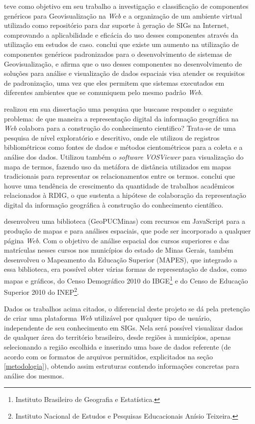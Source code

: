 \documentclass[12pt]{article}
\begin{document}
\citet{laudares} teve como objetivo em seu trabalho a investigação e classificação de componentes genéricos para Geovisualização na \emph{Web} e a organização de um ambiente virtual utilizado como repositório para dar suporte à geração de SIGs na Internet, comprovando a aplicabilidade e eficácia do uso desses componentes através da utilização em estudos de caso. \citeauthor{laudares} conclui que existe um aumento na utilização de componentes genéricos padronizados para o desenvolvimento de sistemas de Geovisualização, e afirma que o uso desses componentes no desenvolvimento de soluções para análise e visualização de dados espaciais visa atender os requisitos de padronização, uma vez que eles permitem que sistemas executados em diferentes ambientes que se comuniquem pelo mesmo padrão \emph{Web}.

\citet{santos} realizou em sua dissertação uma pesquisa que buscasse responder o seguinte problema: de que maneira a representação digital da informação geográfica na \emph{Web} colabora para a construção do conhecimento cientifico? Trata-se de uma pesquisa de nível exploratório e descritivo, onde ele utilizou de registros bibliométricos como fontes de dados e métodos cientométricos para a coleta e a análise dos dados. Utilizou também o \emph{software VOSViewer} para visualização do mapa de termos, fazendo uso da metáfora de distância utilizados em mapas tradicionais para representar os relacionamentos entre os termos. \citeauthor{santos} conclui que houve uma tendência de crescimento da quantidade de trabalhos acadêmicos relacionados à RDIG, o que sustenta a hipótese de colaboração da representação digital da informação geográfica à construção do conhecimento científico.

\citet{kutova} desenvolveu uma biblioteca (GeoPUCMinas) com recursos em JavaScript para a produção de mapas e para análises espaciais, que pode ser incorporado a qualquer página \emph{Web}. Com o objetivo de análise espacial dos cursos superiores e das matrículas nesses cursos nos municípios do estado de Minas Gerais, \citeauthor{kutova} também desenvolveu o Mapeamento da Educação Superior (MAPES), que integrado a essa biblioteca, era possível obter várias formas de representação de dados, como mapas e gráficos, do Censo Demográfico 2010 do IBGE\footnote{Instituto Brasileiro de Geografia e Estatística.} e do Censo de Educação Superior 2010 do INEP\footnote{Instituto Nacional de Estudos e Pesquisas Educacionais Anísio Teixeira.}.

Dados os trabalhos acima citados, o diferencial deste projeto se dá pela pretenção de criar uma plataforma \emph{Web} utilizável por qualquer tipo de usuário, independente de seu conhecimento em SIGs. Nela será possível visualizar dados de qualquer área do território brasileiro, desde regiões à municípios, apenas selecionando a região escolhida e inserindo uma base de dados referente (de acordo com os formatos de arquivos permitidos, explicitados na seção \ref{metodologia}), obtendo assim estruturas contendo informações concretas para análise dos mesmos.
\end{document}
